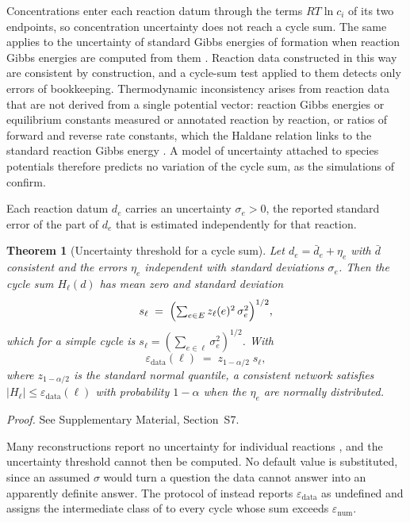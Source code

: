 \documentclass[11pt,a4paper]{article}
\theoremstyle{pstyle}
\newtheorem{theorem}{Theorem}[section]
\theoremstyle{definition}
\theoremstyle{remark}
\newcommand{\abs}[1]{\lvert#1\rvert}
\newcommand{\eps}{\varepsilon}
\newcommand{\epsnum}{\eps_{\mathrm{num}}}
\newcommand{\epsdata}{\eps_{\mathrm{data}}}
\newcommand{\hol}{H}
\begin{document}
Concentrations enter each reaction datum through the terms $RT\ln c_i$
of its two endpoints, so concentration uncertainty does not reach a
cycle sum. The same applies to the uncertainty of standard Gibbs
energies of formation when reaction Gibbs energies are computed from
them \citep{noor2013}. Reaction data constructed in this way are
consistent by construction, and a cycle-sum test applied to them detects
only errors of bookkeeping. Thermodynamic inconsistency arises from
reaction data that are not derived from a single potential vector:
reaction Gibbs energies or equilibrium constants measured or annotated
reaction by reaction, or ratios of forward and reverse rate constants,
which the Haldane relation links to the standard reaction Gibbs energy
\citep{schuster1989}. A model of uncertainty attached to species
potentials therefore predicts no variation of the cycle sum, as the
simulations of  confirm.

\begin{definition}
\label{def:sigma}
Each reaction datum $d_e$ carries an uncertainty $\sigma_e>0$, the
reported standard error of the part of $d_e$ that is estimated
independently for that reaction.
\end{definition}

\begin{theorem}[Uncertainty threshold for a cycle sum]
\label{thm:data-floor}
Let $d_e=\bar d_e+\eta_e$ with $\bar d$ consistent and the errors
$\eta_e$ independent with standard deviations $\sigma_e$. Then the cycle
sum $\hol_\ell(d)$ has mean zero and standard deviation
\begin{equation}
  s_\ell \;=\; \Bigl(\textstyle\sum_{e\in E} z_\ell(e)^{2}\,
  \sigma_e^{2}\Bigr)^{1/2},
  \label{eq:data-sd}
\end{equation}
which for a simple cycle is $s_\ell=(\sum_{e\in\ell}\sigma_e^{2})^{1/2}$.
With
\begin{equation}
  \epsdata(\ell) \;=\; z_{1-\alpha/2}\; s_\ell,
  \label{eq:data-floor}
\end{equation}
where $z_{1-\alpha/2}$ is the standard normal quantile, a consistent
network satisfies $\abs{\hol_\ell} \le \epsdata(\ell)$ with probability
$1-\alpha$ when the $\eta_e$ are normally distributed.
\end{theorem}

\noindent\emph{Proof.} See Supplementary Material, Section~S7.

\begin{remark}
\label{rem:no-sigma}
Many reconstructions report no uncertainty for individual reactions
\citep{brunk2018,orth2010}, and the uncertainty threshold cannot then be
computed. No default value is substituted, since an assumed $\sigma$
would turn a question the data cannot answer into an apparently definite
answer. The protocol of  instead reports $\epsdata$ as
undefined and assigns the intermediate class of  to
every cycle whose sum exceeds $\epsnum$.
\end{remark}
\end{document}
